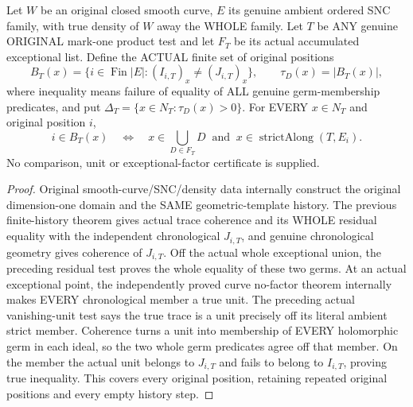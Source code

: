 \begin{theorem}
\label{hir:sharp-original-curve-actual-member-exceptional-difference}
\leanok
Let $W$ be an original closed smooth curve, $E$ its genuine ambient ordered
SNC family, with true density of $W$ away the WHOLE family. Let $T$ be ANY
genuine ORIGINAL mark-one product test and let $F_T$ be its actual accumulated
exceptional list. Define the ACTUAL finite set of original positions
\[
 B_T(x)=\{i\in\operatorname{Fin}|E|:(I_{i,T})_x\ne(J_{i,T})_x\},
 \qquad \tau_D(x)=|B_T(x)|,
\]
where inequality means failure of equality of ALL genuine germ-membership
predicates, and put $\Delta_T=\{x\in N_T:\tau_D(x)>0\}$.
For EVERY $x\in N_T$ and original position $i$,
\[
 i\in B_T(x)\quad\Longleftrightarrow\quad
 x\in\bigcup_{D\in F_T}D\ \text{ and }\ x\in\operatorname{strictAlong}(T,E_i).
\]
No comparison, unit or exceptional-factor certificate is supplied.
\end{theorem}
\begin{proof}
Original smooth-curve/SNC/density data internally construct the original
dimension-one domain and the SAME geometric-template history. The previous
finite-history theorem gives actual trace coherence and its WHOLE residual
equality with the independent chronological $J_{i,T}$, and genuine
chronological geometry gives coherence of $J_{i,T}$. Off the actual whole
exceptional union, the preceding residual test proves the whole equality
of these two germs. At an actual exceptional point, the independently
proved curve no-factor theorem internally makes EVERY chronological member
a true unit. The preceding actual vanishing-unit test says the true trace
is a unit precisely off its literal ambient strict member. Coherence
turns a unit into membership of EVERY holomorphic germ in each ideal, so
the two whole germ predicates agree off that member. On the member the
actual unit belongs to $J_{i,T}$ and fails to belong to $I_{i,T}$, proving
true inequality. This covers every original position, retaining repeated
original positions and every empty history step.
\end{proof}

